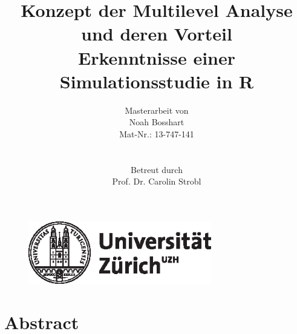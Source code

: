 \documentclass[12pt]{article}\usepackage[]{graphicx}\usepackage[]{color}
\title{Konzept der Multilevel Analyse und deren Vorteil\\ \large{Erkenntnisse einer Simulationsstudie in R}}
\author{Masterarbeit von \\ Noah Bosshart \\ Mat-Nr.: 13-747-141 \\ \\ \\ Betreut durch \\ Prof. Dr. Carolin Strobl}
\begin{document}

\begin{figure}[t]
  \centering
  \includegraphics[width = 8cm]{uzh_logo}
\end{figure}

\maketitle
\thispagestyle{empty}

\newpage
{}
\tableofcontents

\newpage
\listoffigures

\newpage
\listoftables
\newpage


\section{Abstract}
\newpage

\end{document}
